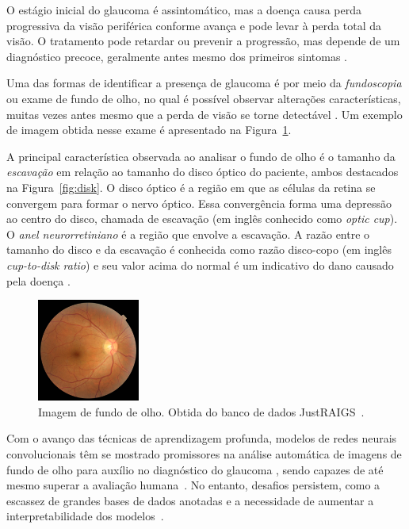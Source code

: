 \documentclass[12pt]{article}
\begin{document}
O estágio inicial do glaucoma é assintomático, mas a doença causa perda progressiva da visão periférica conforme avança e pode levar à perda total da visão. O tratamento pode retardar ou prevenir a progressão, mas depende de um diagnóstico precoce, geralmente antes mesmo dos primeiros sintomas \cite{who_2019}.

Uma das formas de identificar a presença de glaucoma é por meio da \emph{fundoscopia} ou exame de fundo de olho, no qual é possível observar alterações características, muitas vezes antes mesmo que a perda de visão se torne detectável \cite{weinreb_2004}. Um exemplo de imagem obtida nesse exame é apresentado na Figura~\ref{fig:fundus}.

A principal característica observada ao analisar o fundo de olho é o tamanho da \emph{escavação} em relação ao tamanho do disco óptico do paciente, ambos destacados na Figura~\ref{fig:disk}. O disco óptico é a região em que as células da retina se convergem para formar o nervo óptico. Essa convergência forma uma depressão ao centro do disco, chamada de escavação (em inglês conhecido como \emph{optic cup}). O \emph{anel neurorretiniano} é a região que envolve a escavação. A razão entre o tamanho do disco e da escavação é conhecida como razão disco-copo (em inglês \emph{cup-to-disk ratio}) e seu valor acima do normal é um indicativo do dano causado pela doença \cite{weinreb_2004}. %

\begin{figure}[htb]
 \centering
 \includegraphics[width=0.3\textwidth]{images/TRAIN000004_cut.JPG}
 \caption{Imagem de fundo de olho. Obtida do banco de dados JustRAIGS~\cite{justraigs}.}
 \label{fig:fundus}
\end{figure}


Com o avanço das técnicas de aprendizagem profunda, modelos de redes neurais convolucionais têm se mostrado promissores na análise automática de imagens de fundo de olho para auxílio no diagnóstico do glaucoma \cite{li_review_2021}, sendo capazes de até mesmo superar a avaliação humana~\cite{tan_glaucoma_2020}. No entanto, desafios persistem, como a escassez de grandes bases de dados anotadas e a necessidade de aumentar a interpretabilidade dos modelos~\cite{li_review_2021}.
\end{document}
